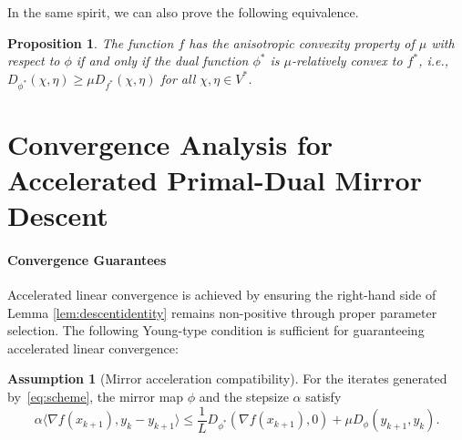 \documentclass{article}
\theoremstyle{plain}
\newtheorem{proposition}[theorem]{Proposition}
\theoremstyle{definition}
\newtheorem{assumption}[theorem]{Assumption}
\theoremstyle{remark}
\begin{document}
In the same spirit, we can also prove the following equivalence.
\begin{proposition}
    The function $f$ has the anisotropic convexity property of $\mu$ with respect to $\phi$ if and only if the dual function $\phi^*$ is $\mu$-relatively convex to $f^*$, i.e., $D_{\phi^*}(\chi, \eta)\geq \mu D_{f^*}(\chi, \eta)$ for all $\chi, \eta\in V^*$.
\end{proposition}

\section{Convergence Analysis for Accelerated Primal-Dual Mirror Descent}
\label{sec:acc_primal_dual}
\paragraph{Convergence Guarantees}
Accelerated linear convergence is achieved by ensuring the right-hand side of Lemma \ref{lem:descentidentity} remains non-positive through proper parameter selection. The following Young-type condition is sufficient for guaranteeing accelerated linear convergence:

\begin{assumption}[Mirror acceleration compatibility]\label{ass:compatibility}
For the iterates generated by~\eqref{eq:scheme}, the mirror map $\phi$ and the
stepsize $\alpha$ satisfy
$$
\alpha\langle \nabla f(x_{k+1}), y_k-y_{k+1}\rangle
\le
\frac1L D_{\phi^*}(\nabla f(x_{k+1}),0)
+
\mu D_\phi(y_{k+1},y_k).
$$
\end{assumption}
\end{document}
